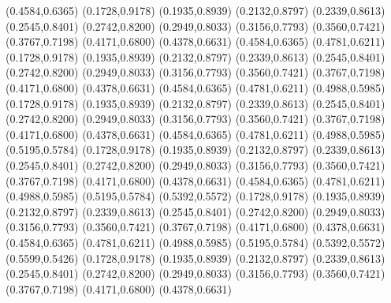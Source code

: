 \PST@Diamond(0.4584,0.6365)
\PST@Diamond(0.1728,0.9178)
\PST@Diamond(0.1935,0.8939)
\PST@Diamond(0.2132,0.8797)
\PST@Diamond(0.2339,0.8613)
\PST@Diamond(0.2545,0.8401)
\PST@Diamond(0.2742,0.8200)
\PST@Diamond(0.2949,0.8033)
\PST@Diamond(0.3156,0.7793)
\PST@Diamond(0.3560,0.7421)
\PST@Diamond(0.3767,0.7198)
\PST@Diamond(0.4171,0.6800)
\PST@Diamond(0.4378,0.6631)
\PST@Diamond(0.4584,0.6365)
\PST@Diamond(0.4781,0.6211)
\PST@Diamond(0.1728,0.9178)
\PST@Diamond(0.1935,0.8939)
\PST@Diamond(0.2132,0.8797)
\PST@Diamond(0.2339,0.8613)
\PST@Diamond(0.2545,0.8401)
\PST@Diamond(0.2742,0.8200)
\PST@Diamond(0.2949,0.8033)
\PST@Diamond(0.3156,0.7793)
\PST@Diamond(0.3560,0.7421)
\PST@Diamond(0.3767,0.7198)
\PST@Diamond(0.4171,0.6800)
\PST@Diamond(0.4378,0.6631)
\PST@Diamond(0.4584,0.6365)
\PST@Diamond(0.4781,0.6211)
\PST@Diamond(0.4988,0.5985)
\PST@Diamond(0.1728,0.9178)
\PST@Diamond(0.1935,0.8939)
\PST@Diamond(0.2132,0.8797)
\PST@Diamond(0.2339,0.8613)
\PST@Diamond(0.2545,0.8401)
\PST@Diamond(0.2742,0.8200)
\PST@Diamond(0.2949,0.8033)
\PST@Diamond(0.3156,0.7793)
\PST@Diamond(0.3560,0.7421)
\PST@Diamond(0.3767,0.7198)
\PST@Diamond(0.4171,0.6800)
\PST@Diamond(0.4378,0.6631)
\PST@Diamond(0.4584,0.6365)
\PST@Diamond(0.4781,0.6211)
\PST@Diamond(0.4988,0.5985)
\PST@Diamond(0.5195,0.5784)
\PST@Diamond(0.1728,0.9178)
\PST@Diamond(0.1935,0.8939)
\PST@Diamond(0.2132,0.8797)
\PST@Diamond(0.2339,0.8613)
\PST@Diamond(0.2545,0.8401)
\PST@Diamond(0.2742,0.8200)
\PST@Diamond(0.2949,0.8033)
\PST@Diamond(0.3156,0.7793)
\PST@Diamond(0.3560,0.7421)
\PST@Diamond(0.3767,0.7198)
\PST@Diamond(0.4171,0.6800)
\PST@Diamond(0.4378,0.6631)
\PST@Diamond(0.4584,0.6365)
\PST@Diamond(0.4781,0.6211)
\PST@Diamond(0.4988,0.5985)
\PST@Diamond(0.5195,0.5784)
\PST@Diamond(0.5392,0.5572)
\PST@Diamond(0.1728,0.9178)
\PST@Diamond(0.1935,0.8939)
\PST@Diamond(0.2132,0.8797)
\PST@Diamond(0.2339,0.8613)
\PST@Diamond(0.2545,0.8401)
\PST@Diamond(0.2742,0.8200)
\PST@Diamond(0.2949,0.8033)
\PST@Diamond(0.3156,0.7793)
\PST@Diamond(0.3560,0.7421)
\PST@Diamond(0.3767,0.7198)
\PST@Diamond(0.4171,0.6800)
\PST@Diamond(0.4378,0.6631)
\PST@Diamond(0.4584,0.6365)
\PST@Diamond(0.4781,0.6211)
\PST@Diamond(0.4988,0.5985)
\PST@Diamond(0.5195,0.5784)
\PST@Diamond(0.5392,0.5572)
\PST@Diamond(0.5599,0.5426)
\PST@Diamond(0.1728,0.9178)
\PST@Diamond(0.1935,0.8939)
\PST@Diamond(0.2132,0.8797)
\PST@Diamond(0.2339,0.8613)
\PST@Diamond(0.2545,0.8401)
\PST@Diamond(0.2742,0.8200)
\PST@Diamond(0.2949,0.8033)
\PST@Diamond(0.3156,0.7793)
\PST@Diamond(0.3560,0.7421)
\PST@Diamond(0.3767,0.7198)
\PST@Diamond(0.4171,0.6800)
\PST@Diamond(0.4378,0.6631)
